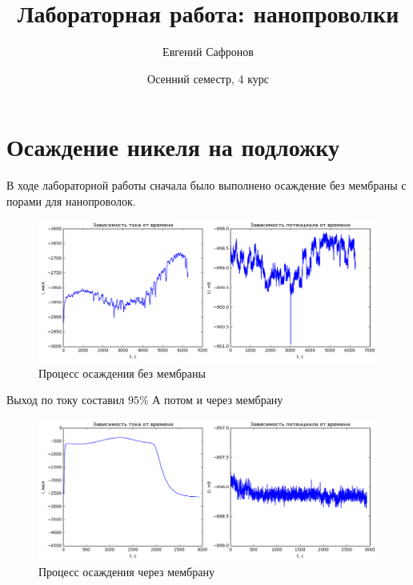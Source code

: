 \documentclass[a4paper]{report}
\title{Лабораторная работа: нанопроволки}
\author{Евгений Сафронов}
\date{Осенний семестр, 4 курс}
\begin{document}
\maketitle


\section{Осаждение никеля на подложку}

В ходе лабораторной работы сначала было выполнено осаждение без мембраны с порами для нанопроволок.

\begin{figure}[h]
\includegraphics[width=1\textwidth]{nomem.png}
\caption{\label{fig:nomem}Процесс осаждения без мембраны}
\end{figure} 

Выход по току составил $95\%$
\newline
\newline
А потом и через мембрану

\begin{figure}[h]
\includegraphics[width=1\textwidth]{mem.png}
\caption{\label{fig:mem}Процесс осаждения через мембрану}
\end{figure}
\end{document}
